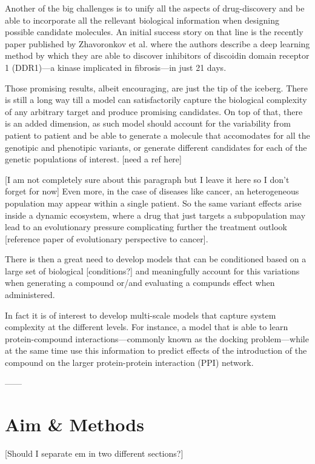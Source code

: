 \documentclass{article}
\begin{document}

Another of the big challenges is to unify all the aspects of drug-discovery and be able
 to incorporate all the rellevant biological information when designing possible
 candidate molecules. An initial success story on that line is the recently paper
 published by Zhavoronkov et al. \cite{Zhavoronkov2019} where the authors describe a
 deep learning method by which they are able to discover inhibitors of discoidin domain
 receptor 1 (DDR1)—a kinase implicated in fibrosis—in just 21 days.

Those promising results, albeit encouraging, are just the tip of the iceberg. There is
still a long way till a model can satisfactorily capture the biological complexity of
any arbitrary target and produce promising candidates. On top of that, there is an added
dimension, as such model should account for the variability from patient to patient and
be able to generate a molecule that accomodates for all the genotipic and phenotipic
variants, or generate different candidates for each of the genetic populations of
interest. [need a ref here]

[I am not completely sure about this paragraph but I leave it here so I don't forget for
now] Even more, in the case of diseases like cancer, an heterogeneous population may
appear within a single patient. So the same variant effects arise inside a dynamic
ecosystem, where a drug that just targets a subpopulation may lead to an evolutionary
pressure complicating further the treatment outlook [reference paper of evolutionary
perspective to cancer].

There is then a great need to develop models that can be conditioned based on a large
set of biological [conditions?] and meaningfully account for this variations when
generating a compound or/and evaluating a compunds effect when administered.

In fact it is of interest to develop multi-scale models that capture system complexity
at the different levels. For instance, a model that is able to learn protein-compound
interactions---commonly known as the docking problem---while at the same time use this
information to predict effects of the introduction of the compound on the larger
protein-protein interaction (PPI) network.

------

\section*{Aim \& Methods}
[Should I separate em in two different sections?]
\end{document}
